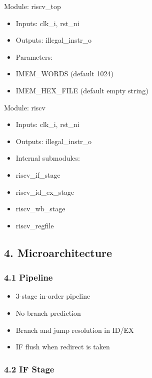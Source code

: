 \documentclass[]{article}
\providecommand{\tightlist}{%
  \setlength{\itemsep}{0pt}\setlength{\parskip}{0pt}}
\begin{document}
Module: riscv\_top

\begin{itemize}
\tightlist
\item
  Inputs: clk\_i, rst\_ni
\item
  Outputs: illegal\_instr\_o
\item
  Parameters:
\item
  IMEM\_WORDS (default 1024)
\item
  IMEM\_HEX\_FILE (default empty string)
\end{itemize}

Module: riscv

\begin{itemize}
\tightlist
\item
  Inputs: clk\_i, rst\_ni
\item
  Outputs: illegal\_instr\_o
\item
  Internal submodules:
\item
  riscv\_if\_stage
\item
  riscv\_id\_ex\_stage
\item
  riscv\_wb\_stage
\item
  riscv\_regfile
\end{itemize}

\hypertarget{4-microarchitecture}{%
\subsection{4. Microarchitecture}\label{4-microarchitecture}}

\hypertarget{41-pipeline}{%
\subsubsection{4.1 Pipeline}\label{41-pipeline}}

\begin{itemize}
\tightlist
\item
  3-stage in-order pipeline
\item
  No branch prediction
\item
  Branch and jump resolution in ID/EX
\item
  IF flush when redirect is taken
\end{itemize}

\hypertarget{42-if-stage}{%
\subsubsection{4.2 IF Stage}\label{42-if-stage}}
\end{document}
